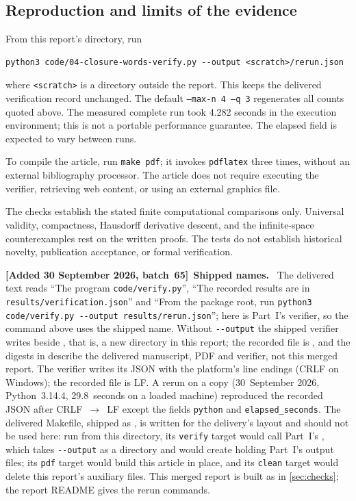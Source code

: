 \documentclass[11pt,letterpaper]{article}
\numberwithin{equation}{section}
\theoremstyle{definition}
\theoremstyle{remark}
\theoremstyle{definition}
\newenvironment{writenoted}[1][]{\par\smallskip\begingroup\small\sloppy
 \noindent\textbf{[Added 30 September 2026, batch~65]}\if\relax\detokenize{#1}\relax\else~\textbf{#1.}\fi\ }%
 {\par\endgroup\smallskip}
\begin{document}
\subsection{Reproduction and limits of the evidence}

From this report's directory, run
\begin{lstlisting}
python3 code/04-closure-words-verify.py --output <scratch>/rerun.json
\end{lstlisting}
where \texttt{<scratch>} is a directory outside the report.
This keeps the delivered verification record unchanged. The default
\texttt{--max-n 4 --q 3} regenerates all counts quoted above.
The measured complete run took 4.282 seconds in the execution environment;
this is not a portable performance guarantee. The elapsed field is expected
to vary between runs.

To compile the article, run \texttt{make pdf}; it invokes \texttt{pdflatex}
three times, without an external bibliography processor. The article does
not require executing the verifier, retrieving web content, or using an
external graphics file.

The checks establish the stated finite computational comparisons only.
Universal validity, compactness, Hausdorff derivative descent, and the
infinite-space counterexamples rest on the written proofs. The tests do not
establish historical novelty, publication acceptance, or formal verification.

\begin{writenoted}[Shipped names]
The delivered text reads ``The program \texttt{code/verify.py}'', ``The
recorded results are in \texttt{results/verification.json}'' and ``From
the package root, run \texttt{python3 code/verify.py -{}-output
results/rerun.json}''; here  is Part~I's verifier,
so the command above uses the shipped name. Without \texttt{-{}-output}
the shipped verifier writes  beside
, that is, a new  directory in this report;
the recorded file is , and
the digests in  describe the
delivered manuscript, PDF and verifier, not this merged report. The
verifier writes its JSON with the platform's line endings (CRLF on
Windows); the recorded file is LF. A rerun on a copy (30~September 2026,
Python~3.14.4, 29.8~seconds on a loaded machine) reproduced the recorded
JSON after CRLF~$\to$~LF except the fields \texttt{python} and
\texttt{elapsed\_seconds}. The delivered Makefile, shipped as
, is written for the delivery's
layout and should not be used here: run from this directory, its
\texttt{verify} target would call Part~I's , which
takes \texttt{-{}-output} as a directory and would create
 holding Part~I's output files; its
\texttt{pdf} target would build this article in place, and its
\texttt{clean} target would delete this report's auxiliary files. This
merged report is built as in \cref{sec:checks}; the report README gives
the rerun commands.
\end{writenoted}
\end{document}
